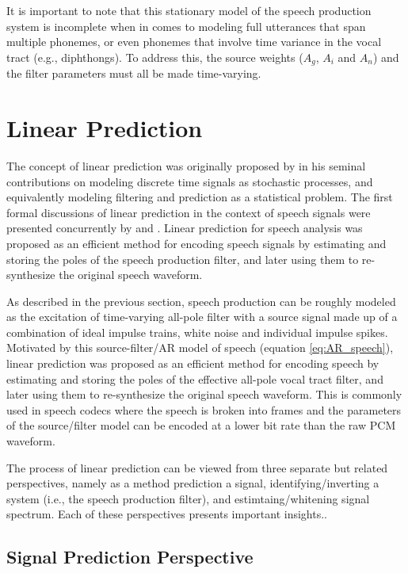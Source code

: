 It is important to note that this stationary model of the speech production system is incomplete when in comes to modeling full utterances that span multiple phonemes, or even phonemes that involve time variance in the vocal tract (e.g., diphthongs). To address this, the source weights ($A_g$, $A_i$ and $A_n$) and the filter parameters must all be made time-varying.

\section{Linear Prediction}

The concept of linear prediction was originally proposed by \cite{wiener1949extrapolation} in his seminal contributions on modeling discrete time signals as stochastic processes, and equivalently modeling filtering and prediction as a statistical problem. The first formal discussions of linear prediction in the context of speech signals were presented concurrently by \cite{saito1967theoretical} and \cite{atal1970adaptive}. Linear prediction for speech analysis was proposed as an efficient method for encoding speech signals by estimating and storing the poles of the speech production filter, and later using them to re-synthesize the original speech waveform. 

As described in the previous section, speech production can be roughly modeled as the excitation of time-varying all-pole filter with a source signal made up of a combination of ideal impulse trains, white noise and individual impulse spikes. Motivated by this source-filter/AR model of speech (equation \ref{eq:AR_speech}), linear prediction was proposed as an efficient method for encoding speech by estimating and storing the poles of the effective all-pole vocal tract filter, and later using them to re-synthesize the original speech waveform. This is commonly used in speech codecs where the speech is broken into frames and the parameters of the source/filter model can be encoded at a lower bit rate than the raw PCM waveform.

The process of linear prediction can be viewed from three separate but related perspectives, namely as a method prediction a signal, identifying/inverting a system (i.e., the speech production filter), and estimtaing/whitening signal spectrum. Each of these perspectives presents important insights..

\subsection{Signal Prediction Perspective}

